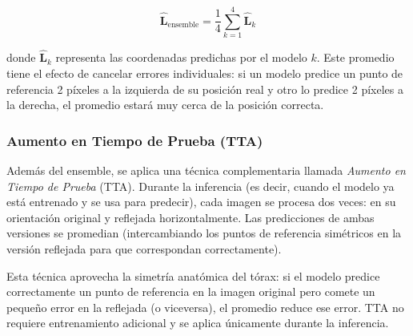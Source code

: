 \begin{equation}
    \hat{\mathbf{L}}_{\text{ensemble}} = \frac{1}{4} \sum_{k=1}^{4} \hat{\mathbf{L}}_k
    \label{eq:ensemble_average}
\end{equation}

\noindent donde $\hat{\mathbf{L}}_k$ representa las coordenadas predichas por el modelo $k$. Este promedio tiene el efecto de cancelar errores individuales: si un modelo predice un punto de referencia 2 píxeles a la izquierda de su posición real y otro lo predice 2 píxeles a la derecha, el promedio estará muy cerca de la posición correcta.

\subsubsection{Aumento en Tiempo de Prueba (TTA)}

Además del ensemble, se aplica una técnica complementaria llamada \textit{Aumento en Tiempo de Prueba} (TTA). Durante la inferencia (es decir, cuando el modelo ya está entrenado y se usa para predecir), cada imagen se procesa dos veces: en su orientación original y reflejada horizontalmente. Las predicciones de ambas versiones se promedian (intercambiando los puntos de referencia simétricos en la versión reflejada para que correspondan correctamente).

Esta técnica aprovecha la simetría anatómica del tórax: si el modelo predice correctamente un punto de referencia en la imagen original pero comete un pequeño error en la reflejada (o viceversa), el promedio reduce ese error. TTA no requiere entrenamiento adicional y se aplica únicamente durante la inferencia.
